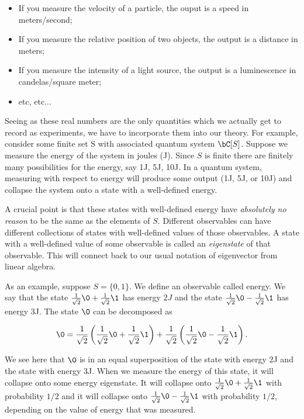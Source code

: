 \begin{itemize}
\item If you measure the velocity of a particle, the ouput is a speed in meters/second;
\item If you measure the relative position of two objects, the output is a distance in meters;
\item If you measure the intensity of a light source, the output is a luminescence in candelas/square meter;
\item etc, etc...
\end{itemize}

Seeing as these real numbers are the only quantities which we actually get to record as experiments, we have to incorporate them into our theory. For example, consider some finite set S with associated quantum system $\bC[S]$. Suppose we measure the energy of the system in joules (J). Since $S$ is finite there are finitely many possibilities for the energy, say 1J, 5J, 10J. In a quantum system, measuring with respect to energy will produce some output (1J, 5J, or 10J) and collapse the system onto a state with a well-defined energy.

A crucial point is that these states with well-defined energy have {\em absolutely no reason} to be the same as the elements of $S$. Different observables can have different collections of states with well-defined values of those observables. A state with a well-defined value of some observable is called an {\em eigenstate} of that observable. This will connect back to our usual notation of eigenvector from linear algebra.

As an example, suppose $S=\{0,1\}$. We define an observable called energy. We say that the state $\frac{1}{\sqrt{2}}\0+\frac{1}{\sqrt{2}}\1$ has energy $2J$ and the state $\frac{1}{\sqrt{2}}\0-\frac{1}{\sqrt{2}}\1$ has energy 3J. The state $\0$ can be decomposed as

$$\0=\frac{1}{\sqrt{2}}\left(\frac{1}{\sqrt{2}}\0+\frac{1}{\sqrt{2}}\1\right)+\frac{1}{\sqrt{2}}\left(\frac{1}{\sqrt{2}}\0-\frac{1}{\sqrt{2}}\1\right).$$

We see here that $\0$ is in an equal superposition of the state with energy 2J and the state with energy 3J. When we measure the energy of this state, it will collapse onto some energy eigenstate. It will collapse onto $\frac{1}{\sqrt{2}}\0+\frac{1}{\sqrt{2}}\1$ with probability $1/2$ and it will collapse onto $\frac{1}{\sqrt{2}}\0-\frac{1}{\sqrt{2}}\1$ with probability $1/2$, depending on the value of energy that was measured.

